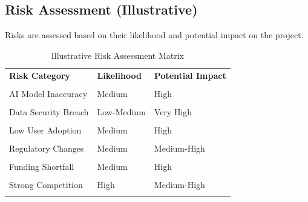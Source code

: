\subsection{Risk Assessment (Illustrative)}
Risks are assessed based on their likelihood and potential impact on the project.
\begin{table}[H]
    \centering
    \caption{Illustrative Risk Assessment Matrix}
    \label{tab:risk_assessment}
    \begin{tabularx}{\linewidth}{@{}Xll@{}}
        \toprule
        \rowcolor{Gray}\textbf{Risk Category} & \textbf{Likelihood} & \textbf{Potential Impact} \\\\
        \midrule
        AI Model Inaccuracy & Medium & High \\\\
        Data Security Breach & Low-Medium & Very High \\\\
        Low User Adoption & Medium & High \\\\
        Regulatory Changes & Medium & Medium-High \\\\
        Funding Shortfall & Medium & High \\\\
        Strong Competition & High & Medium-High \\\\
        \bottomrule
    \end{tabularx}
\end{table}


